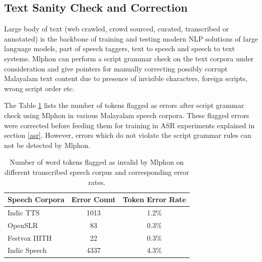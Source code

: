 \documentclass{ieeeaccess}
\begin{document}
\subsection{Text Sanity Check and Correction}

Large body of text (web crawled, crowd sourced, curated, transcribed or annotated) is the backbone of training and testing modern NLP solutions of  large language models,  part of speech taggers, text to speech and speech to text systems. Mlphon can perform a script grammar check on the text corpora under consideration and give pointers for manually correcting possibly corrupt Malayalam text content due to presence of invisible characters, foreign scripts, wrong script order etc.


The Table \ref{sanitycheck} lists the number of tokens flagged as errors after script grammar check using Mlphon in various Malayalam speech corpora. These flagged errors were corrected before feeding them for training in ASR experiments explained in section \ref{asr}. However, errors which do not violate the script grammar rules can not be detected by Mlphon.

\begin{table}[!h]
\caption{Number of word tokens flagged as invalid by Mlphon on different transcribed speech corpus and corresponding error rates.}
\label{sanitycheck}
\begin{tabular}{lcc}
\hline \hline
Speech Corpora & Error Count & Token Error Rate \\
\hline
Indic TTS \cite{baby2016resources}& 1013 & 1.2\% \\
OpenSLR \cite{he-etal-2020-open}& 83 & 0.3\%\\
Festvox IIITH \cite{prahallad2012iiit}& 22 & 0.3\% \\
Indic Speech \cite{srivastava-etal-2020-indicspeech}& 4337 & 4.3\%\\
\hline
\end{tabular}
\end{table}
\vspace{0.2cm}



\end{document}
